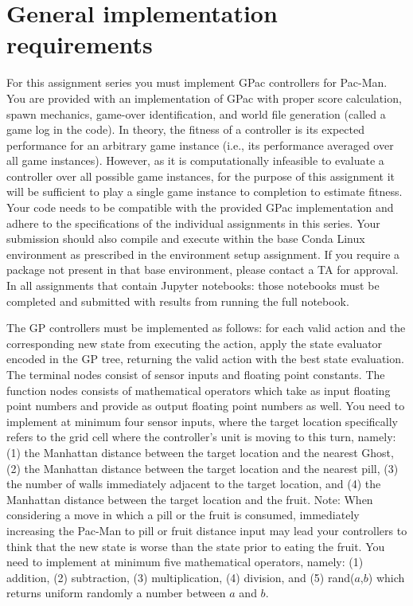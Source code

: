 \documentclass{article}
\begin{document}
\section*{General implementation requirements}
For this assignment series you must implement GPac controllers for Pac-Man. You are provided with an implementation of GPac with proper score calculation, spawn mechanics, game-over identification, and world file generation (called a game log in the code). In theory, the fitness of a controller is its expected performance for an arbitrary game instance (i.e., its performance averaged over all game instances). However, as it is computationally infeasible to evaluate a controller over all possible game instances, for the purpose of this assignment it will be sufficient to play a single game instance to completion to estimate fitness. Your code needs to be compatible with the provided GPac implementation and adhere to the specifications of the individual assignments in this series. Your submission should also compile and execute within the base Conda Linux environment as prescribed in the environment setup assignment. If you require a package not present in that base environment, please contact a TA for approval. In all assignments that contain Jupyter notebooks: those notebooks must be completed and submitted with results from running the full notebook.

The GP controllers must be implemented as follows: for each valid action and the corresponding new state from executing the action, apply the state evaluator encoded in the GP tree, returning the valid action with the best state evaluation. The terminal nodes consist of sensor inputs and floating point constants. The function nodes consists of mathematical operators which take as input floating point numbers and provide as output floating point numbers as well. You need to implement at minimum four sensor inputs, where the target location specifically refers to the grid cell where the controller's unit is moving to this turn, namely: (1) the Manhattan distance between the target location and the nearest Ghost, (2) the Manhattan distance between the target location and the nearest pill, (3) the number of walls immediately adjacent to the target location, and (4) the Manhattan distance between the target location and the fruit. Note: When considering a move in which a pill or the fruit is consumed, immediately increasing the Pac-Man to pill or fruit distance input may lead your controllers to think that the new state is worse than the state prior to eating the fruit. You need to implement at minimum five mathematical operators, namely: (1) addition, (2) subtraction, (3) multiplication, (4) division, and (5) rand($a$,$b$) which returns uniform randomly a number between $a$ and $b$.
\end{document}
